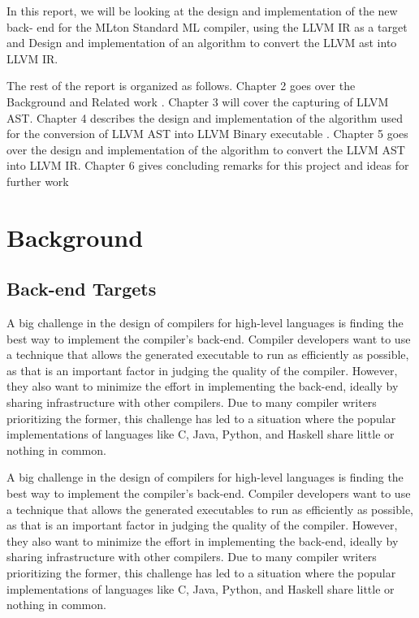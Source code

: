 \documentclass{book}
\begin{document}
In this report, we will be looking at the design and implementation of the new back-
end for the MLton Standard ML compiler, using the LLVM IR as a target and Design and implementation of an algorithm to convert the LLVM ast into LLVM IR.

The rest of the report is organized as follows. Chapter 2 goes over the Background and Related work . Chapter 3 will cover the capturing of LLVM AST. Chapter 4 describes the design
and implementation of the algorithm used for the conversion of LLVM AST into LLVM Binary executable . Chapter 5 goes over the design and implementation of the algorithm to convert the LLVM AST into LLVM IR. Chapter 6 gives concluding remarks for this project and ideas for further work

\chapter{Background}
\Large
	\section{Back-end Targets}
	A  big  challenge  in  the  design  of  compilers  for  high-level  languages  is  finding  the  best
	way to implement the compiler's back-end.  Compiler developers want to use a technique
	that allows the generated executable to run as efficiently as possible, as that is an important
	factor in judging the quality of the compiler. However, they also want to minimize the effort
	in implementing the back-end, ideally by sharing infrastructure with other compilers. Due
	to many compiler writers prioritizing the former, this challenge has led to a situation where
	the popular implementations of languages like C, Java, Python, and Haskell share little or
	nothing in common.
	
	A  big  challenge  in  the  design  of  compilers  for  high-level  languages  is  finding  the  best
	way to implement the compiler's back-end.  Compiler developers want to use a technique
	that allows the generated executables to run as efficiently as possible, as that is an important
	factor in judging the quality of the compiler. However, they also want to minimize the effort
	in implementing the back-end, ideally by sharing infrastructure with other compilers. Due
	to many compiler writers prioritizing the former, this challenge has led to a situation where
	the popular implementations of languages like C, Java, Python, and Haskell share little or
	nothing in common.
	
\end{document}
